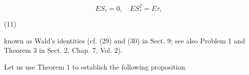 $$E S_{\tau} = 0, \quad E S_{\tau}^2 = E \tau,$$

(11)

known as Wald’s identities (cf. (29) and (30) in Sect. 9; see also Problem 1 and Theorem 3 in Sect. 2, Chap. 7, Vol. 2).

Let us use Theorem 1 to establish the following proposition.
